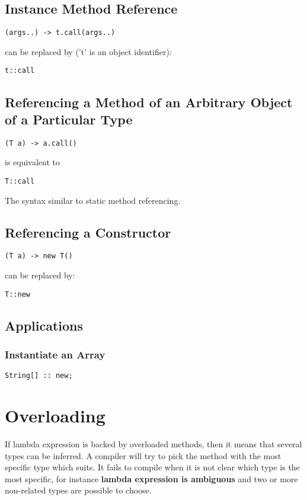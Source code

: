 \documentclass{report}
\begin{document}
\subsection{Instance Method Reference}
\begin{verbatim}
(args..) -> t.call(args..)
\end{verbatim}
can be replaced by ('t' is an object identifier):
\begin{verbatim}
t::call
\end{verbatim}

\subsection{Referencing a Method of an Arbitrary Object of a Particular Type}
\begin{verbatim}
(T a) -> a.call()
\end{verbatim}
is equivalent to
\begin{verbatim}
T::call
\end{verbatim}
The syntax similar to static method referencing.

\subsection{Referencing a Constructor}
\begin{verbatim}
(T a) -> new T()
\end{verbatim}
can be replaced by:
\begin{verbatim}
T::new
\end{verbatim}

\subsection{Applications}

\subsubsection*{Instantiate an Array}
\begin{verbatim}
String[] :: new;
\end{verbatim}

\section{Overloading}
If lambda expression is backed by overloaded methods, then it means that several types can be inferred.
A compiler will try to pick the method with the most specific type which suits. It fails to compile when it is not clear 
which type is the most specific, for instance \textbf{lambda expression is ambiguous }and two or more non-related types are possible to choose.
\end{document}
